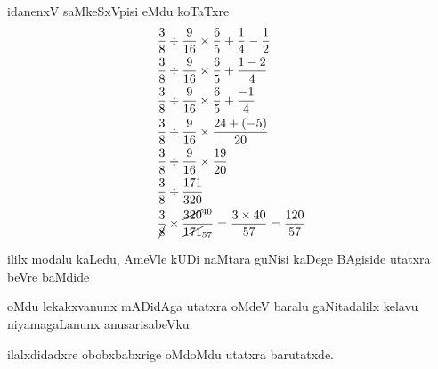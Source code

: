 idanenxV saMkeSxVpisi eMdu koTaTxre
\begin{align*}
& \dfrac{3}{8}\div \dfrac{9}{16}\times\dfrac{6}{5}+\dfrac{1}{4}-\dfrac{1}{2}\\
& \dfrac{3}{8}\div \dfrac{9}{16}\times\dfrac{6}{5}+\dfrac{1-2}{4}\\
& \dfrac{3}{8}\div \dfrac{9}{16}\times \dfrac{6}{5}+\dfrac{-1}{4}\\
& \dfrac{3}{8}\div \dfrac{9}{16}\times \dfrac{24+(-5)}{20}\\
& \dfrac{3}{8}\div \dfrac{9}{16}\times \dfrac{19}{20}\\
& \dfrac{3}{8}\div \dfrac{171}{320}\\
& \dfrac{3}{\cancel{8}}\times \dfrac{\cancel{320}^{40}}{\cancel{171}_{57}}=\dfrac{3\times 40}{57}=\dfrac{120}{57}
\end{align*}

ililx modalu kaLedu, AmeVle kUDi naMtara guNisi kaDege BAgiside utatxra beVre baMdide

oMdu lekakxvanunx mADidAga utatxra oMdeV baralu gaNitadalilx kelavu niyamagaLanunx anusarisabeVku.

ilalxdidadxre obobxbabxrige oMdoMdu utatxra barutatxde.
